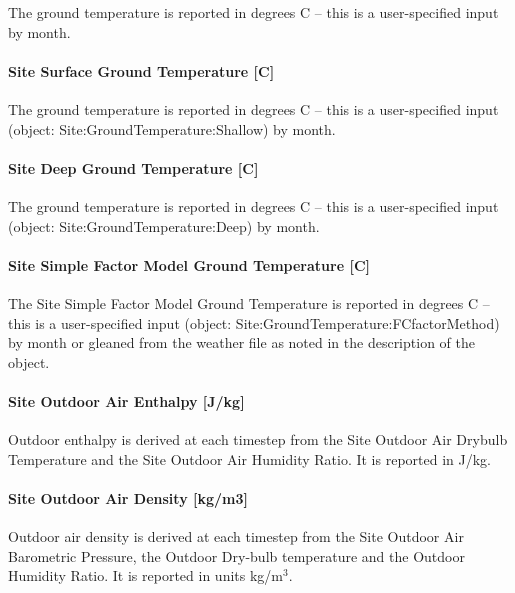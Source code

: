 The ground temperature is reported in degrees C -- this is a user-specified input by month.

\paragraph{Site Surface Ground Temperature {[}C{]}}\label{site-surface-ground-temperature-c}

The ground temperature is reported in degrees C -- this is a user-specified input (object: Site:GroundTemperature:Shallow) by month.

\paragraph{Site Deep Ground Temperature {[}C{]}}\label{site-deep-ground-temperature-c}

The ground temperature is reported in degrees C -- this is a user-specified input (object: Site:GroundTemperature:Deep) by month.

\paragraph{Site Simple Factor Model Ground Temperature {[}C{]}}\label{site-simple-factor-model-ground-temperature-c}

The Site Simple Factor Model Ground Temperature is reported in degrees C -- this is a user-specified input (object: Site:GroundTemperature:FCfactorMethod) by month or gleaned from the weather file as noted in the description of the object.

\paragraph{Site Outdoor Air Enthalpy {[}J/kg{]}}\label{site-outdoor-air-enthalpy-jkg}

Outdoor enthalpy is derived at each timestep from the Site Outdoor Air Drybulb Temperature and the Site Outdoor Air Humidity Ratio. It is reported in J/kg.

\paragraph{Site Outdoor Air Density {[}kg/m3{]}}\label{site-outdoor-air-density-kgm3}

Outdoor air density is derived at each timestep from the Site Outdoor Air Barometric Pressure, the Outdoor Dry-bulb temperature and the Outdoor Humidity Ratio. It is reported in units kg/m\(^{3}\).

